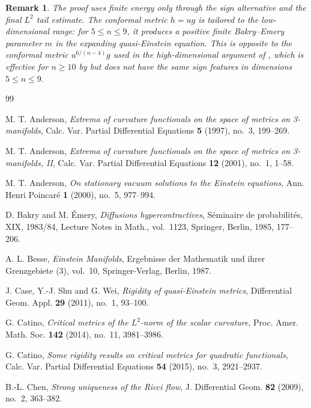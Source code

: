 \documentclass[11pt]{amsart}
\numberwithin{equation}{section}
\newtheorem{remark}[theorem]{Remark}
\begin{document}
\begin{remark}
The proof uses finite energy only through the sign alternative and the final $L^2$ tail estimate.  The conformal metric $h=ug$ is tailored to the low-dimensional range: for $5\leq n\leq9$, it produces a positive finite Bakry--Emery parameter $m$ in the expanding quasi-Einstein equation.  This is opposite to the conformal metric $u^{6/(n-4)}g$ used in the high-dimensional argument of \cite{CMM2026}, which is effective for $n\geq10$ by \cite[Theorem~1.1]{CMM2026} but does not have the same sign features in dimensions $5\leq n\leq9$.
\end{remark}


\begin{thebibliography}{99}

M. T. Anderson,
\emph{Extrema of curvature functionals on the space of metrics on 3-manifolds},
Calc. Var. Partial Differential Equations \textbf{5} (1997), no.~3, 199--269.

M. T. Anderson,
\emph{Extrema of curvature functionals on the space of metrics on 3-manifolds, II},
Calc. Var. Partial Differential Equations \textbf{12} (2001), no.~1, 1--58.

M. T. Anderson,
\emph{On stationary vacuum solutions to the Einstein equations},
Ann. Henri Poincar\'e \textbf{1} (2000), no.~5, 977--994.

D. Bakry and M. \'{E}mery,
\emph{Diffusions hypercontractives},
S\'eminaire de probabilit\'es, XIX, 1983/84,
Lecture Notes in Math., vol.~1123,
Springer, Berlin, 1985, 177--206.

A. L. Besse,
\emph{Einstein Manifolds},
Ergebnisse der Mathematik und ihrer Grenzgebiete (3), vol.~10,
Springer-Verlag, Berlin, 1987.

J. Case, Y.-J. Shu and G. Wei,
\emph{Rigidity of quasi-Einstein metrics},
Differential Geom. Appl. \textbf{29} (2011), no.~1, 93--100.

G. Catino,
\emph{Critical metrics of the $L^2$-norm of the scalar curvature},
Proc. Amer. Math. Soc. \textbf{142} (2014), no.~11, 3981--3986.

G. Catino,
\emph{Some rigidity results on critical metrics for quadratic functionals},
Calc. Var. Partial Differential Equations \textbf{54} (2015), no.~3, 2921--2937.

B.-L. Chen,
\emph{Strong uniqueness of the Ricci flow},
J. Differential Geom. \textbf{82} (2009), no.~2, 363--382.


\end{thebibliography}
\end{document}
